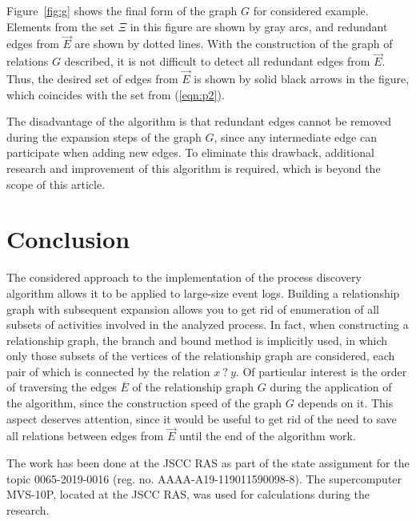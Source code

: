 \documentclass[
11pt,%
tightenlines,%
twoside,%
onecolumn,%
nofloats,%
nobibnotes,%
nofootinbib,%
superscriptaddress,%
noshowpacs,%
centertags]%
{revtex4}
\begin{document}
Figure~\ref{fig:g} shows the final form of the graph $G$ for considered example.
Elements from the set $\Xi$ in this figure are shown by gray arcs, and redundant edges from $\overrightarrow{E}$ are shown by dotted lines.
With the construction of the graph of relations $G$ described, it is not difficult to detect all redundant edges from $\overrightarrow{E}$.
Thus, the desired set of edges from $\overrightarrow{E}$ is shown by solid black arrows in the figure, which coincides with the set from (\ref{eqn:p2}).

The disadvantage of the algorithm is that redundant edges cannot be removed during the expansion steps of the graph $G$, since any intermediate edge can participate when adding new edges.
To eliminate this drawback, additional research and improvement of this algorithm is required, which is beyond the scope of this article.

\section{Conclusion}

The considered approach to the implementation of the process discovery algorithm allows it to be applied to large-size event logs.
Building a relationship graph with subsequent expansion allows you to get rid of enumeration of all subsets of activities involved in the analyzed process.
In fact, when constructing a relationship graph, the branch and bound method is implicitly used, in which only those subsets of the vertices of the relationship graph are considered, each pair of which is connected by the relation $x \ ? \ y$.
Of particular interest is the order of traversing the edges $\overline{E}$ of the relationship graph $G$ during the application of the algorithm, since the construction speed of the graph $G$ depends on it.
This aspect deserves attention, since it would be useful to get rid of the need to save all relations between edges from $\overrightarrow{E}$ until the end of the algorithm work.

\begin{acknowledgments}
The work has been done at the JSCC RAS as part of the state assignment for the topic 0065-2019-0016 (reg. no. AAAA-A19-119011590098-8). The supercomputer MVS-10P, located at the JSCC RAS, was used for calculations during the research.
\end{acknowledgments}
\end{document}
